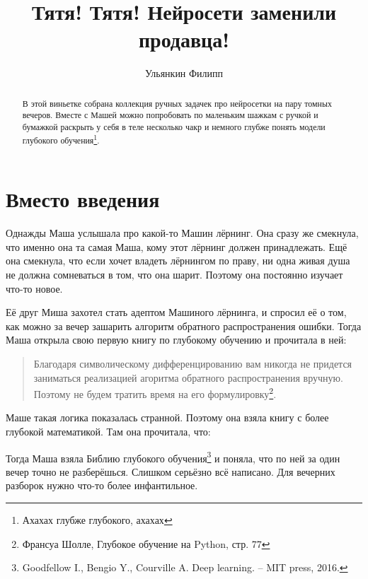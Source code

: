 \documentclass[12pt, a4paper, oneside]{article}
\title{Тятя! Тятя! Нейросети заменили продавца!}
\date{ }
\author{Ульянкин Филипп}
\begin{document}
\togglefalse{lecture}

\maketitle
	
\begin{abstract}
    В этой виньетке собрана коллекция ручных задачек про нейросетки на пару томных вечеров. Вместе с Машей можно попробовать по маленьким шажкам с ручкой и бумажкой раскрыть у себя в теле несколько чакр и немного глубже понять модели глубокого обучения\footnote{Ахахах глубже глубокого, ахахах}.
\end{abstract}

\section*{Вместо введения}
    Однажды Маша услышала про какой-то Машин лёрнинг. Она сразу же смекнула, что именно она та самая Маша, кому этот лёрнинг должен принадлежать. Ещё она смекнула, что если хочет владеть лёрнингом по праву, ни одна живая душа не должна сомневаться в том, что она шарит. Поэтому она постоянно изучает что-то новое. 
    
    Её друг Миша захотел стать адептом Машиного лёрнинга, и спросил её о том, как можно за вечер зашарить алгоритм обратного распространения ошибки. Тогда Маша открыла свою первую книгу по глубокому обучению и прочитала в ней: 
    
    \begin{quote}
    Благодаря символическому дифференцированию вам никогда не придется заниматься реализацией агоритма обратного распространения вручную. Поэтому не будем тратить время на его формулировку\footnote{Франсуа Шолле, Глубокое обучение на Python, стр. 77}.
    \end{quote} 
    
    Маше такая логика показалась странной. Поэтому она взяла книгу с более глубокой математикой. Там она прочитала, что: 
    
    \begin{quote}
    \end{quote} 
    
    Тогда Маша взяла Библию глубокого обучения\footnote{Goodfellow I., Bengio Y., Courville A. Deep learning. – MIT press, 2016.} и поняла, что по ней за один вечер точно не разберёшься. Слишком серьёзно всё написано. Для вечерних разборок нужно что-то более инфантильное. 
    
\end{document}

